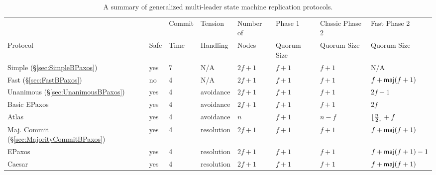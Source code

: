 \begin{table*}[ht]
  \centering
  \caption{%
    A summary of generalized multi-leader state machine replication
    protocols.
  }%
  \begin{tabular}{llllllll}
    \toprule
                                                             &      & Commit & Tension    & Number of & Phase 1     & Classic Phase 2 & Fast Phase 2 \\
    Protocol                                                 & Safe & Time   & Handling   & Nodes     & Quorum Size & Quorum Size     & Quorum Size \\\midrule
    Simple \BPaxos{} (\S\ref{sec:SimpleBPaxos})              & yes  & 7      & N/A        & $2f+1$    & $f+1$       & $f+1$           & N/A \\
    Fast \BPaxos{} (\S\ref{sec:FastBPaxos})                  & no   & 4      & N/A        & $2f+1$    & $f+1$       & $f+1$           & $f+\textsf{maj}(f+1)$  \\
    Unanimous \BPaxos{} (\S\ref{sec:UnanimousBPaxos})        & yes  & 4      & avoidance  & $2f+1$    & $f+1$       & $f+1$           & $2f+1$ \\
    Basic EPaxos~\cite{moraru2013there}                      & yes  & 4      & avoidance  & $2f+1$    & $f+1$       & $f+1$           & $2f$ \\
    Atlas~\cite{enes2020state}                               & yes  & 4      & avoidance  & $n$       & $f+1$       & $n-f$           & $\lfloor\frac{n}{2}\rfloor + f$ \\
    Maj. Commit \BPaxos{} (\S\ref{sec:MajorityCommitBPaxos}) & yes  & 4      & resolution & $2f+1$    & $f+1$       & $f+1$           & $f + \textsf{maj}(f+1)$ \\
    EPaxos~\cite{moraru2013proof}                            & yes  & 4      & resolution & $2f+1$    & $f+1$       & $f+1$           & $f + \textsf{maj}(f+1) - 1$ \\
    Caesar~\cite{arun2017speeding}                           & yes  & 4      & resolution & $2f+1$    & $f+1$       & $f+1$           & $f + \textsf{maj}(f+1)$ \\
    \bottomrule
  \end{tabular}
\end{table*}
